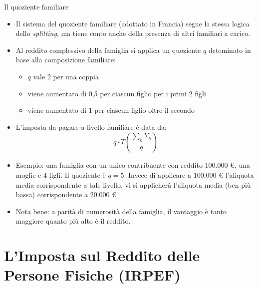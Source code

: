\documentclass[11pt]{beamer}
\newcommand\€{\,\text{€}}
\begin{document}
\begin{frame}{Il quoziente familiare}
\begin{itemize}
\item Il sistema del \alert{quoziente familiare} (adottato in Francia) segue la stessa
logica dello \emph{splitting}, ma tiene conto anche della presenza di altri
familiari a carico.
\item Al reddito complessivo della famiglia si applica un quoziente $q$ deteminato
in base alla composizione familiare:
\begin{itemize}
\item $q$ vale 2 per una coppia
\item viene aumentato di 0,5 per ciascun figlio per i primi 2 figli
\item viene aumentato di 1 per ciascun figlio oltre il secondo
\end{itemize}
\item L'imposta da pagare a livello familiare è data da:
\begin{equation*}
  q\cdot T\left(\frac{\sum_{h}Y_{h}}{q}\right)
\end{equation*}
\item Esempio: una famiglia con un unico contribuente con reddito 100.000 €, una
moglie e 4 figli. Il quoziente è $q=5$. Invece di applicare a 100.000 €
l'aliquota media corrispondente a tale livello, vi si applicherà l'aliquota
media (ben più bassa) corrispondente a 20.000 €
\item Nota bene: a parità di numerosità della famiglia, il vantaggio è tanto
maggiore quanto più alto è il reddito.
\end{itemize}
\end{frame}

\section{L'Imposta sul Reddito delle Persone Fisiche (IRPEF)}
\end{document}
